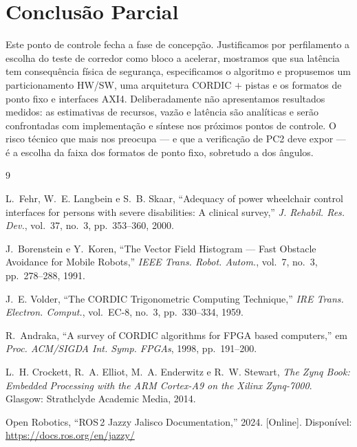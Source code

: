 \documentclass[conference]{IEEEtran}
\begin{document}
\section{Conclus\~ao Parcial}

Este ponto de controle fecha a fase de concep\c{c}\~ao. Justificamos por
perfilamento a escolha do teste de corredor como bloco a acelerar, mostramos que
sua lat\^encia tem consequ\^encia f\'isica de seguran\c{c}a, especificamos o
algoritmo e propusemos um particionamento HW/SW, uma arquitetura CORDIC $+$
pistas e os formatos de ponto fixo e interfaces AXI4. Deliberadamente n\~ao
apresentamos resultados medidos: as estimativas de recursos, vaz\~ao e
lat\^encia s\~ao anal\'iticas e ser\~ao confrontadas com implementa\c{c}\~ao e
s\'intese nos pr\'oximos pontos de controle. O risco t\'ecnico que mais nos
preocupa --- e que a verifica\c{c}\~ao de PC2 deve expor --- \'e a escolha da
faixa dos formatos de ponto fixo, sobretudo a dos \^angulos.

\begin{thebibliography}{9}

L.~Fehr, W.~E. Langbein e S.~B. Skaar, ``Adequacy of power wheelchair control
interfaces for persons with severe disabilities: A clinical survey,''
\emph{J. Rehabil. Res. Dev.}, vol.~37, no.~3, pp.~353--360, 2000.

J.~Borenstein e Y.~Koren, ``The Vector Field Histogram --- Fast Obstacle
Avoidance for Mobile Robots,'' \emph{IEEE Trans. Robot. Autom.}, vol.~7, no.~3,
pp.~278--288, 1991.

J.~E. Volder, ``The CORDIC Trigonometric Computing Technique,'' \emph{IRE Trans.
Electron. Comput.}, vol.~EC-8, no.~3, pp.~330--334, 1959.

R.~Andraka, ``A survey of CORDIC algorithms for FPGA based computers,'' em
\emph{Proc. ACM/SIGDA Int. Symp. FPGAs}, 1998, pp.~191--200.

L.~H. Crockett, R.~A. Elliot, M.~A. Enderwitz e R.~W. Stewart, \emph{The Zynq
Book: Embedded Processing with the ARM Cortex-A9 on the Xilinx Zynq-7000}.
Glasgow: Strathclyde Academic Media, 2014.

Open Robotics, ``ROS\,2 Jazzy Jalisco Documentation,'' 2024. [Online].
Dispon\'ivel: \url{https://docs.ros.org/en/jazzy/}

\end{thebibliography}
\end{document}
